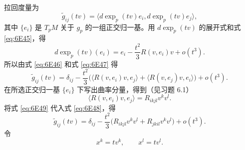 \begin{itemize}
拉回度量为
\begin{equation*}
  \widetilde g_{ij}(tv)=
   \bigl\langle d\exp_p(tv)e_i,d\exp_p(tv)e_j\bigr\rangle,
  \tag{6E46}\label{eq:6E46}
\end{equation*}
其中 $\{e_i\}$ 是 $T_pM$ 关于 $g_p$ 的一组正交归一基。用 $d\exp_p(tv)$ 的展开式和式 \eqref{eq:6E45}，得
\begin{equation*}
  d\exp_p(tv)(e_i)=e_i-\frac{t^2}{3}R(v,e_i)v+o(t^3).
  \tag{6E47}\label{eq:6E47}
\end{equation*}
所以由式 \eqref{eq:6E46} 和式 \eqref{eq:6E47} 得
\begin{equation*}
 \widetilde g_{ij}(tv)=\delta_{ij}-\frac{t^2}{3}
 \bigl(\langle R(v,e_i)v,e_j\rangle+\langle R(v,e_j)v,e_i\rangle\bigr)+o(t^3).
 \tag{6E48}\label{eq:6E48}
\end{equation*}
在所选正交归一基 $\{e_i\}$ 下写出曲率分量，得到（见习题 6.1）
\begin{equation*}
  \langle R(v,e_i)v,e_j\rangle=R_{ikjl}v^kv^l.
  \tag{6E49}\label{eq:6E49}
\end{equation*}
将式 \eqref{eq:6E49} 代入式 \eqref{eq:6E48}，得
\begin{equation*}
  \widetilde g_{ij}(tv)=\delta_{ij}-\frac{t^2}{3}
      \bigl(R_{ikjl}v^kv^l+R_{jkil}v^kv^l\bigr)+o(t^3).
  \tag{6E50}\label{eq:6E50}
\end{equation*}
令
\begin{equation*}
  x^k=tv^k,\qquad x^l=tv^l.
  \tag{6E51}\label{eq:6E51}
\end{equation*}


\end{itemize}
